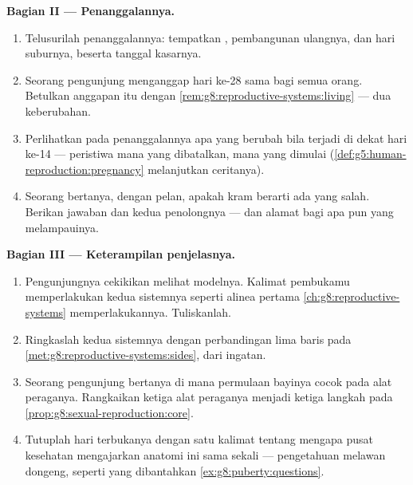 \begin{problem}
\medskip\noindent\textbf{Bagian II --- Penanggalannya.}
\begin{enumerate}[resume]
  \item Telusurilah penanggalannya: tempatkan ,
        pembangunan ulangnya,  dan hari suburnya,
        beserta tanggal kasarnya.
  \item Seorang pengunjung menganggap hari ke-28 sama bagi
        semua orang. Betulkan anggapan itu dengan
        \cref{rem:g8:reproductive-systems:living} --- dua
        keberubahan.
  \item Perlihatkan pada penanggalannya apa yang berubah
        bila  terjadi di dekat hari ke-14 ---
        peristiwa mana yang dibatalkan, mana yang dimulai
        (\cref{def:g5:human-reproduction:pregnancy}
        melanjutkan ceritanya).
  \item Seorang  bertanya, dengan pelan, apakah kram
        berarti ada yang salah. Berikan jawaban  dan
        kedua penolongnya --- dan alamat bagi apa pun yang
        melampauinya.
\end{enumerate}

\medskip\noindent\textbf{Bagian III --- Keterampilan
penjelasnya.}
\begin{enumerate}[resume]
  \item Pengunjungnya cekikikan melihat modelnya. Kalimat
        pembukamu memperlakukan kedua sistemnya seperti
        alinea pertama \cref{ch:g8:reproductive-systems}
        memperlakukannya. Tuliskanlah.
  \item Ringkaslah kedua sistemnya dengan perbandingan lima
        baris pada \cref{met:g8:reproductive-systems:sides},
        dari ingatan.
  \item Seorang pengunjung bertanya di mana permulaan
        bayinya cocok pada alat peraganya. Rangkaikan ketiga
        alat peraganya menjadi ketiga langkah pada
        \cref{prop:g8:sexual-reproduction:core}.
  \item Tutuplah hari terbukanya dengan satu kalimat tentang
        mengapa pusat kesehatan mengajarkan anatomi ini sama
        sekali --- pengetahuan melawan dongeng, seperti yang
        dibantahkan \cref{ex:g8:puberty:questions}.
\end{enumerate}
\end{problem}
